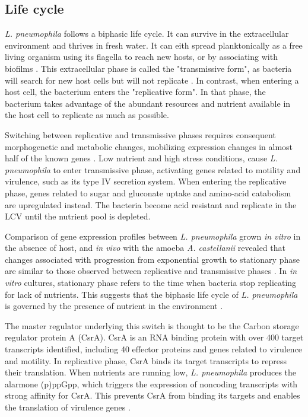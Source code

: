 \subsection{Life cycle}
\textit{L. pneumophila} follows a biphasic life cycle. It can survive in the extracellular environment and thrives in fresh water. It can eith spread planktonically as a free living organism using its flagella to reach new hosts, or by associating with biofilms \citep{hilbiLegionellaSppOutdoors2011,steinertLegionellaPneumophilaAquatic2002}. This extracellular phase is called the "transmissive form", as bacteria will search for new host cells but will not replicate \cite{byrneExpressionLegionellaPneumophilaVirulence1998}. In contrast, when entering a host cell, the bacterium enters the "replicative form". In that phase, the  bacterium takes advantage of the abundant resources and nutrient available in the host cell to replicate as much as possible.

Switching between replicative and transmissive phases requires consequent morphogenetic and metabolic changes, mobilizing expression changes in almost half of the known genes \cite{steinertLegionellaPneumophilaAquatic2002}. Low nutrient and high stress conditions, cause \textit{L. pneumophila} to enter transmissive phase, activating genes related to motility and virulence, such as its type IV secretion system. When entering the replicative phase, genes related to sugar and gluconate uptake and amino-acid catabolism are upregulated instead. The bacteria become acid resistant and replicate in the \acrshort{LCV} until the nutrient pool is depleted.

Comparison of gene expression profiles between \textit{L. pneumophila} grown \textit{in vitro} in the absence of host, and \textit{in vivo} with the amoeba \textit{A. castellanii} revealed that changes associated with progression from exponential growth to stationary phase are similar to those observed between replicative and transmissive phases \cite{bruggemannVirulenceStrategiesInfecting2006}. In \textit{in vitro} cultures, stationary phase refers to the time when bacteria stop replicating for lack of nutrients. This suggests that the biphasic life cycle of \textit{L. pneumophila} is governed by the presence of nutrient in the environment \cite{olivaLifeCyclePneumophila2018}.

The master regulator underlying this switch is thought to be the Carbon storage regulator protein A (CsrA). CsrA is an RNA binding protein with over 400 target transcripts identified, including 40 effector proteins and genes related to virulence and motility. In replicative phase, CsrA binds its target transcripts to repress their translation. When nutrients are running low, \textit{L. pneumophila} produces the alarmone (p)ppGpp, which triggers the expression of noncoding transcripts with strong affinity for CsrA. This prevents CsrA from binding its targets and enables the translation of virulence genes \cite{sahrLegionellaPneumophilaGenome2017}.

